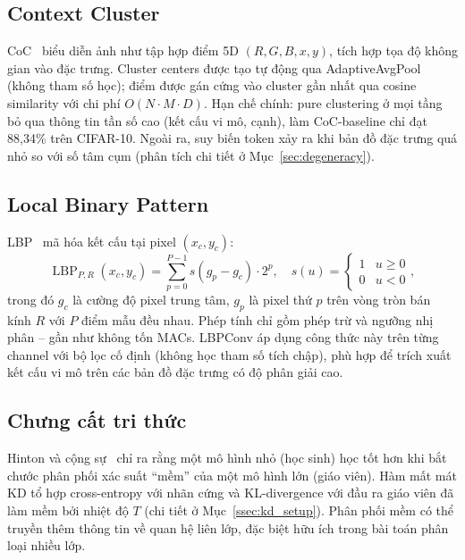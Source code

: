 \documentclass[conference]{IEEEtran}
\begin{document}
\subsection{Context Cluster}

CoC~\cite{Ma2023ImageAsSetOfPoints} biểu diễn ảnh như tập hợp điểm
5D $(R,G,B,x,y)$, tích hợp tọa độ không gian vào đặc trưng. Cluster
centers được tạo tự động qua AdaptiveAvgPool (không tham số học);
điểm được gán cứng vào cluster gần nhất qua cosine similarity với
chi phí $O(N\!\cdot\!M\!\cdot\!D)$. Hạn chế chính: pure clustering ở
mọi tầng bỏ qua thông tin tần số cao (kết cấu vi mô, cạnh), làm
CoC-baseline chỉ đạt 88,34\% trên CIFAR-10. Ngoài ra, suy biến
token xảy ra khi bản đồ đặc trưng quá nhỏ so với số tâm cụm (phân
tích chi tiết ở Mục~\ref{sec:degeneracy}).

\subsection{Local Binary Pattern}

LBP~\cite{Ojala2002LBP} mã hóa kết cấu tại pixel $(x_c,y_c)$:
\begin{equation}
  \operatorname{LBP}_{P,R}(x_c,y_c) =
  \sum_{p=0}^{P-1} s(g_p - g_c)\cdot 2^p, \quad
  s(u) = \begin{cases}1 & u\geq0\\0 & u<0\end{cases},
  \label{eq:lbp}
\end{equation}
trong đó $g_c$ là cường độ pixel trung tâm, $g_p$ là pixel thứ $p$
trên vòng tròn bán kính $R$ với $P$ điểm mẫu đều nhau. Phép tính
chỉ gồm phép trừ và ngưỡng nhị phân -- gần như không tốn MACs.
LBPConv áp dụng công thức này trên từng channel với bộ lọc cố định
(không học tham số tích chập), phù hợp để trích xuất kết cấu vi mô
trên các bản đồ đặc trưng có độ phân giải cao.

\subsection{Chưng cất tri thức}

Hinton và cộng sự~\cite{Hinton2015Distillation} chỉ ra rằng một mô
hình nhỏ (học sinh) học tốt hơn khi bắt chước phân phối xác suất
``mềm'' của một mô hình lớn (giáo viên). Hàm mất mát KD tổ hợp
cross-entropy với nhãn cứng và KL-divergence với đầu ra giáo viên đã
làm mềm bởi nhiệt độ $T$ (chi tiết ở Mục~\ref{ssec:kd_setup}). Phân
phối mềm có thể truyền thêm thông tin về quan hệ liên lớp, đặc biệt
hữu ích trong bài toán phân loại nhiều lớp.
\end{document}
